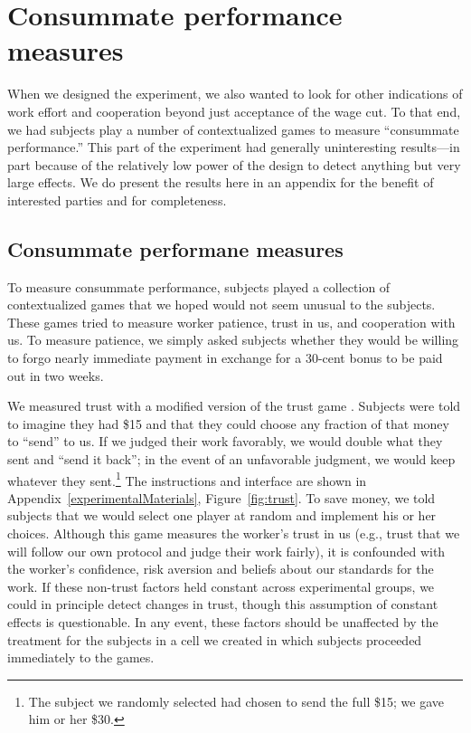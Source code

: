 \documentclass[11pt]{article}
\begin{document}



\appendix 

\newpage

\section{Consummate performance measures} \label{sec:games}
When we designed the experiment, we also wanted to look for other indications of work effort and cooperation beyond just acceptance of the wage cut.
To that end, we had subjects play a number of contextualized games to measure ``consummate performance.''
This part of the experiment had generally uninteresting results---in part because of the relatively low power of the design to detect anything but very large effects.
We do present the results here in an appendix for the benefit of interested parties and for completeness. 

\subsection{Consummate performane measures}
To measure consummate performance, subjects played a collection of contextualized games that we hoped would not seem unusual to the subjects.
These games tried to measure worker patience, trust in us, and cooperation with us. 
To measure patience, we simply asked subjects whether they would be willing to forgo nearly immediate payment in exchange for a 30-cent bonus to be paid out in two weeks. 

We measured trust with a modified version of the trust game \citep{glaeser2000}.
Subjects were told to imagine they had \$15 and that they could choose any fraction of that money to ``send'' to us. 
If we judged their work favorably, we would double what they sent and ``send it back''; in the event of an unfavorable judgment, we would keep whatever they sent.\footnote{
  The subject we randomly selected had chosen to send the full \$15; we gave him or her \$30.
} 
The instructions and interface are shown in Appendix~\ref{experimentalMaterials}, Figure~\ref{fig:trust}. 
To save money, we told subjects that we would select one player at random and implement his or her choices. 
Although this game measures the worker's trust in us (e.g., trust that we will follow our own protocol and judge their work fairly), it is confounded with the worker's confidence, risk aversion and beliefs about our standards for the
work. 
If these non-trust factors held constant across experimental groups, we could in principle detect changes in trust, though this assumption of constant effects is questionable.
In any event, these factors should be unaffected by the treatment for the subjects in a cell we created in which subjects proceeded immediately to the games. 
\end{document}
